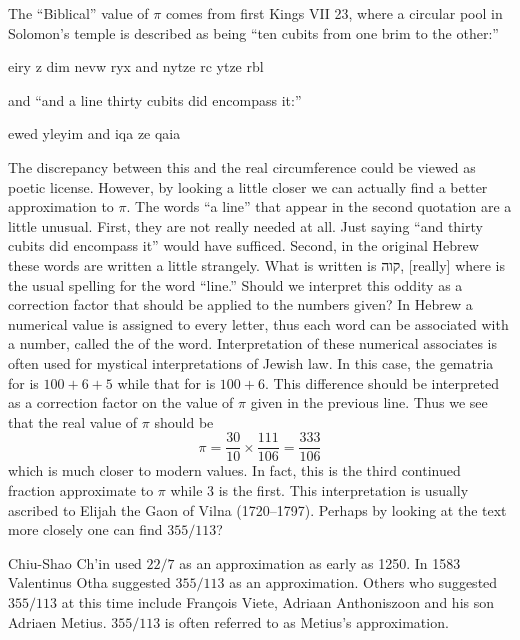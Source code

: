 The ``Biblical'' value of $\pi$ comes from first Kings VII 23, where a
circular pool in Solomon's temple is described as being ``ten cubits from
one brim to the other:''
\begin{cjhebrew}
 eiry {}z dim nevw ryx and nytze rc ytze rbl
\end{cjhebrew}
\noindent
and ``and a line thirty cubits did encompass it:''
 \begin{cjhebrew}
ewed yleyim a{}nd iqa {}ze qaia 
\end{cjhebrew}

The discrepancy between this and the real circumference could be viewed
as poetic license.  However, by looking a little closer we can actually
find a better approximation to $\pi$.  The words ``a line'' that appear in
the second quotation are a little unusual.  First, they are not
really needed at all.  Just saying ``and thirty cubits did encompass it''
would have sufficed.  Second, in the original Hebrew these words are
written a little strangely.  What is written is \foreignlanguage{hebrew}{קוה}, [really] where
 is the usual spelling for the word ``line.''  Should we interpret
this oddity as a correction factor that should be applied to the
numbers given?  In Hebrew a numerical value is assigned to every
letter, thus each word can be associated with a number, called the
 of the word.  Interpretation of these numerical
associates is often used for mystical interpretations of Jewish law.
In this case, the gematria for  is $100+6+5$ while that for
 is $100+6$.  This difference should be interpreted as a
correction factor on the value of $\pi$ given in the previous line.
Thus we see that the real value of $\pi$ 
should be 
\[
\pi = \frac{30}{10} \times \frac{111}{106} = \frac{333}{106}
\]
which is much closer to modern values.  In fact, this is the third
continued fraction approximate to $\pi$ while $3$ is the first.  This
interpretation is usually ascribed to Elijah the Gaon of
Vilna (1720--1797).  Perhaps by looking
at the text more closely one can find $355/113$?

Chiu-Shao Ch'in used $22/7$ as an approximation
as early as 1250.  In 1583 Valentinus Otha
suggested $355/113$ as an approximation.  Others who suggested
$355/113$ at this time include Fran\c{c}ois Viete, Adriaan Anthoniszoon and
his son Adriaen Metius. $355/113$ is often
referred to as Metius's approximation.

